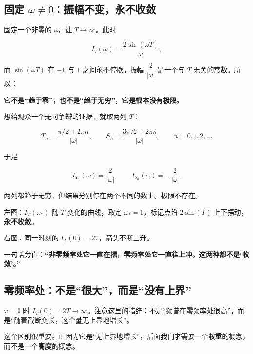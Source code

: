 \subsection{固定 $\omega\neq0$：振幅不变，永不收敛}

固定一个非零的 $\omega$，让 $T\to\infty$。此时

\begin{equation}
I_T(\omega)=\frac{2\sin(\omega T)}{\omega},
\end{equation}

而 $\sin(\omega T)$ 在 $-1$ 与 $1$ 之间永不停歇。振幅 $\dfrac{2}{|\omega|}$ 是一个与 $T$ 无关的常数。所以：

\begin{center}
\textbf{它不是“趋于零”，也不是“趋于无穷”，它是根本没有极限。}
\end{center}

想给观众一个无可争辩的证据，就取两列 $T$：

\begin{equation}
T_n=\frac{\pi/2+2\pi n}{|\omega|},
\qquad
S_n=\frac{3\pi/2+2\pi n}{|\omega|},
\qquad n=0,1,2,\dots
\end{equation}

于是

\begin{equation}
I_{T_n}(\omega)=\frac{2}{|\omega|},
\qquad
I_{S_n}(\omega)=-\frac{2}{|\omega|}.
\end{equation}

两列都趋于无穷，但结果分别停在两个不同的数上。极限不存在。

\begin{scriptbox}[动画要点 01-B]
左图：$I_T(\omega_*)$ 随 $T$ 变化的曲线，取定 $\omega_*=1$，标记点沿 $2\sin(T)$ 上下摆动，\textbf{永不收敛}。

右图：同一时刻的 $I_T(0)=2T$，箭头不断上升。

一句话旁白：\textbf{“非零频率处它一直在摆，零频率处它一直往上冲。这两种都不是‘收敛’。”}
\end{scriptbox}

\subsection{零频率处：不是“很大”，而是“没有上界”}

$\omega=0$ 时 $I_T(0)=2T\to\infty$。注意这里的措辞：不是“频谱在零频率处很高”，而是“随着截断变长，这个量无上界地增长”。

这个区别很重要。正因为它是“无上界地增长”，后面我们才需要一个\textbf{权重}的概念，而不是一个\textbf{高度}的概念。

